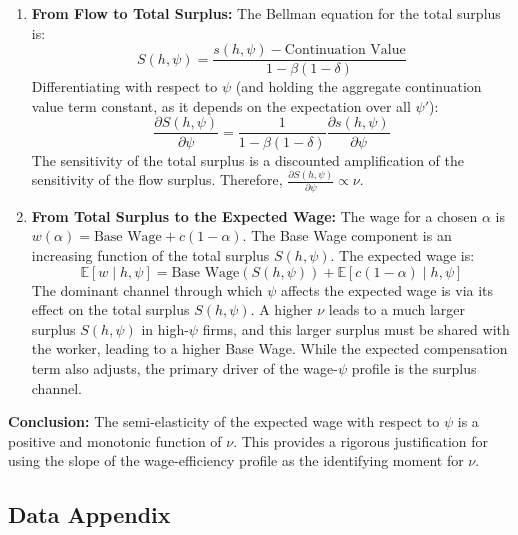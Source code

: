 \documentclass[
  11pt,
  letterpaper,
  DIV=11,
  numbers=noendperiod]{scrartcl}
\begin{document}
\begin{enumerate}
\def\labelenumi{\arabic{enumi}.}
\item
  \textbf{From Flow to Total Surplus:} The Bellman equation for the
  total surplus is:
  \[ S(h, \psi) = \frac{s(h, \psi) - \text{Continuation Value}}{1 - \beta(1 - \delta)} \]
  Differentiating with respect to \(\psi\) (and holding the aggregate
  continuation value term constant, as it depends on the expectation
  over all \(\psi'\)):
  \[ \frac{\partial S(h, \psi)}{\partial \psi} = \frac{1}{1 - \beta(1 - \delta)} \frac{\partial s(h, \psi)}{\partial \psi} \]
  The sensitivity of the total surplus is a discounted amplification of
  the sensitivity of the flow surplus. Therefore,
  \(\frac{\partial S(h, \psi)}{\partial \psi} \propto \nu\).
\item
  \textbf{From Total Surplus to the Expected Wage:} The wage for a
  chosen \(\alpha\) is \(w(\alpha) = \text{Base Wage} + c(1-\alpha)\).
  The Base Wage component is an increasing function of the total surplus
  \(S(h, \psi)\). The expected wage is:
  \[ \mathbb{E}[w \mid h, \psi] = \text{Base Wage}(S(h, \psi)) + \mathbb{E}[c(1-\alpha) \mid h, \psi] \]
  The dominant channel through which \(\psi\) affects the expected wage
  is via its effect on the total surplus \(S(h, \psi)\). A higher
  \(\nu\) leads to a much larger surplus \(S(h, \psi)\) in high-\(\psi\)
  firms, and this larger surplus must be shared with the worker, leading
  to a higher Base Wage. While the expected compensation term also
  adjusts, the primary driver of the wage-\(\psi\) profile is the
  surplus channel.
\end{enumerate}

\textbf{Conclusion:} The semi-elasticity of the expected wage with
respect to \(\psi\) is a positive and monotonic function of \(\nu\).
This provides a rigorous justification for using the slope of the
wage-efficiency profile as the identifying moment for \(\nu\).

\subsection{\texorpdfstring{\textbf{Data
Appendix}}{Data Appendix}}\label{data-appendix}
\end{document}
